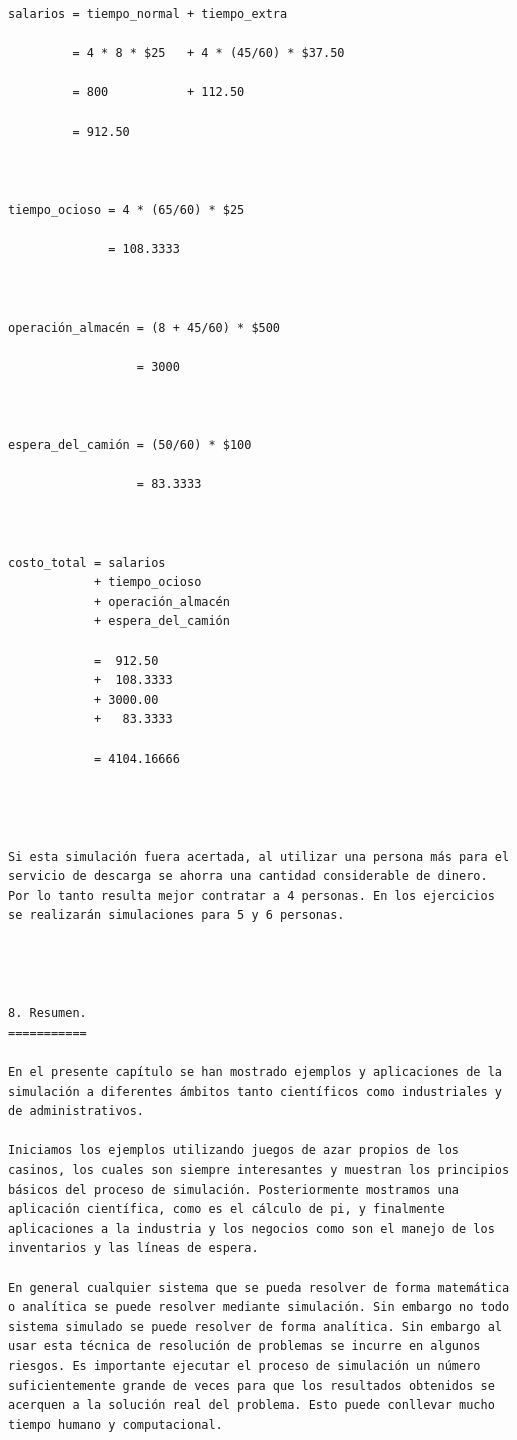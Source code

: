 \begin{verbatim}
salarios = tiempo_normal + tiempo_extra

         = 4 * 8 * $25   + 4 * (45/60) * $37.50

         = 800           + 112.50

         = 912.50



tiempo_ocioso = 4 * (65/60) * $25
              
              = 108.3333



operación_almacén = (8 + 45/60) * $500
                 
                  = 3000



espera_del_camión = (50/60) * $100
 
                  = 83.3333



costo_total = salarios 
            + tiempo_ocioso 
            + operación_almacén
            + espera_del_camión

            =  912.50
            +  108.3333
            + 3000.00
            +   83.3333

            = 4104.16666




Si esta simulación fuera acertada, al utilizar una persona más para el servicio de descarga se ahorra una cantidad considerable de dinero. Por lo tanto resulta mejor contratar a 4 personas. En los ejercicios se realizarán simulaciones para 5 y 6 personas.




8. Resumen.
===========

En el presente capítulo se han mostrado ejemplos y aplicaciones de la simulación a diferentes ámbitos tanto científicos como industriales y de administrativos.

Iniciamos los ejemplos utilizando juegos de azar propios de los casinos, los cuales son siempre interesantes y muestran los principios básicos del proceso de simulación. Posteriormente mostramos una aplicación científica, como es el cálculo de pi, y finalmente aplicaciones a la industria y los negocios como son el manejo de los inventarios y las líneas de espera.

En general cualquier sistema que se pueda resolver de forma matemática o analítica se puede resolver mediante simulación. Sin embargo no todo sistema simulado se puede resolver de forma analítica. Sin embargo al usar esta técnica de resolución de problemas se incurre en algunos riesgos. Es importante ejecutar el proceso de simulación un número suficientemente grande de veces para que los resultados obtenidos se acerquen a la solución real del problema. Esto puede conllevar mucho tiempo humano y computacional.




\end{verbatim}
